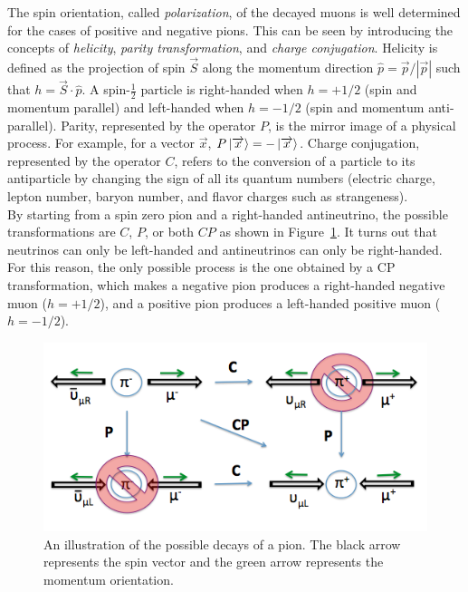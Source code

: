 \documentclass{outhesis}
\begin{document}
The spin orientation, called \emph{polarization},  of the decayed muons is well determined for the cases of positive and negative pions. This can be seen by introducing the concepts of \emph{helicity}, \emph{parity transformation}, and \emph{charge conjugation}. Helicity is defined as the projection of spin $\overrightarrow{S}$ along the momentum direction $\hat{p} = \overrightarrow{p}/|\overrightarrow{p}|$ such that $h = \overrightarrow{S}\cdot \hat{p}$. A spin-$\frac{1}{2}$ particle is right-handed when $h=+1/2$ (spin and momentum parallel) and left-handed when $h=-1/2$ (spin and momentum anti-parallel). Parity, represented by the operator $P$, is the mirror image of a physical process. For example, for a vector $\overrightarrow{x}$, $P\ket{\overrightarrow{x}} = -\ket{\overrightarrow{x}}$. Charge conjugation, represented by the operator $C$, refers to the conversion of a particle to its antiparticle by changing the sign of all its quantum numbers (electric charge, lepton number, baryon number, and flavor charges such as strangeness). \\ 
By starting from a spin zero pion and a right-handed antineutrino, the possible transformations are $C$, $P$, or both $CP$ as shown in Figure~\ref{fig:cp}. It turns out that neutrinos can only be left-handed and antineutrinos can only be right-handed. For this reason, the only possible process is the one obtained by a CP transformation, which makes a negative pion produces a right-handed negative muon ($h=+1/2$), and a positive pion produces a left-handed positive muon ($h=-1/2$). 
\begin{figure}
  \centering
  \includegraphics[scale=0.5]{figures/pion_cp}
  \caption{An illustration of the possible decays of a pion. The black arrow represents the spin vector and the green arrow represents the momentum orientation.}
  \label{fig:cp}
\end{figure}
\end{document}
